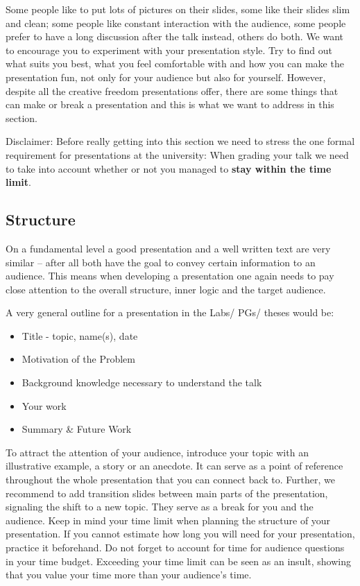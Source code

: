 \documentclass[twocolumn]{mlai-guide}
\begin{document}
Some people like to put lots of pictures on their slides, some like their slides slim and clean; some people like constant interaction with the audience, some people prefer to have a long discussion after the talk instead, others do both. We want to encourage you to experiment with your presentation style. Try to find out what suits you best, what you feel comfortable with and how you can make the presentation fun, not only for your audience but also for yourself. However, despite all the creative freedom presentations offer, there are some things that can make or break a presentation and this is what we want to address in this section. 

Disclaimer: Before really getting into this section we need to stress the one formal requirement for presentations at the university: When grading your talk we need to take into account whether or not you managed to \textbf{stay within the time limit}. 

\subsection{Structure}

On a fundamental level a good presentation and a well written text are very similar -- after all both have the goal to convey certain information to an audience. This means when developing a presentation one again needs to pay close attention to the overall structure, inner logic and the target audience.

A very general outline for a presentation in the Labs/ PGs/ theses would be:
\begin{itemize}
    \item Title - topic, name(s), date
    \item Motivation of the Problem
    \item Background knowledge necessary to understand the talk
    \item Your work
    \item Summary \& Future Work
\end{itemize}

To attract the attention of your audience, introduce your topic with an illustrative example, a story or an anecdote.
It can serve as a point of reference throughout the whole presentation that you can connect back to.
Further, we recommend to add transition slides between main parts of the presentation, signaling the shift to a new topic. They serve as a break for you and the audience. 
Keep in mind your time limit when planning the structure of your presentation. If you cannot estimate how long you will need for your presentation, practice it beforehand. Do not forget to account for time for audience questions in your time budget. Exceeding your time limit can be seen as an insult, showing that you value your time more than your audience's time.
\end{document}
